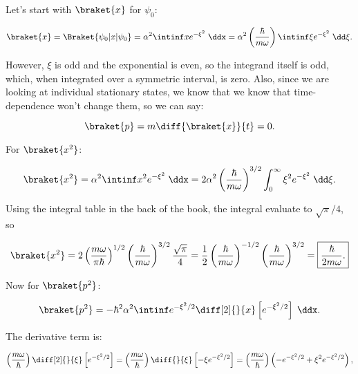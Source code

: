 \begin{parts}

\item Let's start with $\braket{x}$ for $\psi_0$:

\begin{equation*}
    \braket{x} = \Braket{\psi_0 | x | \psi_0} = \alpha^2 \intinf x e^{-\xi^2}\;\ddx = \alpha^2 \left( \frac{\hbar}{m\omega} \right) \intinf \xi e^{-\xi^2}\;\dd\xi.
\end{equation*}

However, $\xi$ is odd and the exponential is even, so the integrand itself is odd, which, when integrated over a symmetric interval, is zero. Also, since we are looking at individual stationary states, we know that we know that time-dependence won't change them, so we can say:

\begin{equation*}
    \braket{p} = m\diff{\braket{x}}{t} = 0.
\end{equation*}

For $\braket{x^2}$:

\begin{equation*}
    \braket{x^2} = \alpha^2 \intinf x^2 e^{-\xi^2}\;\ddx = 2\alpha^2 \left( \frac{\hbar}{m\omega} \right)^{3/2} \int_0^{\infty} \xi^2 e^{-\xi^2}\;\dd\xi.
\end{equation*}

Using the integral table in the back of the book, the integral evaluate to $\sqrt{\pi}/4$, so

\begin{equation*}
    \braket{x^2} = 2\left( \frac{m\omega}{\pi\hbar} \right)^{1/2} \left( \frac{\hbar}{m\omega} \right)^{3/2} \frac{\sqrt{\pi}}{4} = \frac{1}{2}\left( \frac{\hbar}{m\omega} \right)^{-1/2}\left( \frac{\hbar}{m\omega} \right)^{3/2} = \boxed{\frac{\hbar}{2m\omega}.}
\end{equation*}


Now for $\braket{p^2}$:

\begin{equation*}
    \braket{p^2} = -\hbar^2\alpha^2 \intinf e^{-\xi^2/2} \diff[2]{}{x}\left[ e^{-\xi^2/2} \right] \;\ddx.
\end{equation*}

The derivative term is:

\begin{equation*}
    \left( \frac{m\omega}{\hbar} \right) \diff[2]{}{\xi}\left[ e^{-\xi^2/2} \right] = \left( \frac{m\omega}{\hbar} \right)\diff{}{\xi}\left[ -\xi e^{-\xi^2/2} \right] = \left( \frac{m\omega}{\hbar} \right)\left( - e^{-\xi^2/2} + \xi^2 e^{-\xi^2/2} \right),
\end{equation*}


\end{parts}

